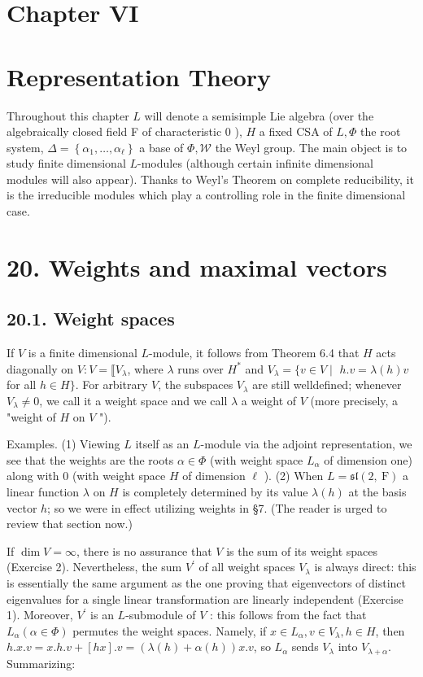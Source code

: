 \documentclass[10pt]{article}
\begin{document}
\section*{Chapter VI}
\section*{Representation Theory}
Throughout this chapter $L$ will denote a semisimple Lie algebra (over the algebraically closed field F of characteristic 0 ), $H$ a fixed CSA of $L, \Phi$ the root system, $\Delta=\left\{\alpha_{1}, \ldots, \alpha_{\ell}\right\}$ a base of $\Phi, \mathscr{W}$ the Weyl group. The main object is to study finite dimensional $L$-modules (although certain infinite dimensional modules will also appear). Thanks to Weyl's Theorem on complete reducibility, it is the irreducible modules which play a controlling role in the finite dimensional case.

\section*{20. Weights and maximal vectors}
\subsection*{20.1. Weight spaces}
If $V$ is a finite dimensional $L$-module, it follows from Theorem 6.4 that $H$ acts diagonally on $V: V=\llbracket V_{\lambda}$, where $\lambda$ runs over $H^{*}$ and $V_{\lambda}=\{v \in V \mid$ $h . v=\lambda(h) v$ for all $h \in H\}$. For arbitrary $V$, the subspaces $V_{\lambda}$ are still welldefined; whenever $V_{\lambda} \neq 0$, we call it a weight space and we call $\lambda$ a weight of $V$ (more precisely, a "weight of $H$ on $V$ ").

Examples. (1) Viewing $L$ itself as an $L$-module via the adjoint representation, we see that the weights are the roots $\alpha \in \Phi$ (with weight space $L_{\alpha}$ of dimension one) along with 0 (with weight space $H$ of dimension $\ell$ ). (2) When $L=\mathfrak{s l}(2, \mathrm{~F})$ a linear function $\lambda$ on $H$ is completely determined by its value $\lambda(h)$ at the basis vector $h$; so we were in effect utilizing weights in §7. (The reader is urged to review that section now.)

If $\operatorname{dim} V=\infty$, there is no assurance that $V$ is the sum of its weight spaces (Exercise 2). Nevertheless, the sum $V^{\prime}$ of all weight spaces $V_{\lambda}$ is always direct: this is essentially the same argument as the one proving that eigenvectors of distinct eigenvalues for a single linear transformation are linearly independent (Exercise 1). Moreover, $V^{\prime}$ is an $L$-submodule of $V$ : this follows from the fact that $L_{\alpha}(\alpha \in \Phi)$ permutes the weight spaces. Namely, if $x \in L_{\alpha}, v \in V_{\lambda}, h \in H$, then $h . x . v=x . h . v+[h x] . v=(\lambda(h)+\alpha(h)) x . v$, so $L_{\alpha}$ sends $V_{\lambda}$ into $V_{\lambda+\alpha}$. Summarizing:
\end{document}
